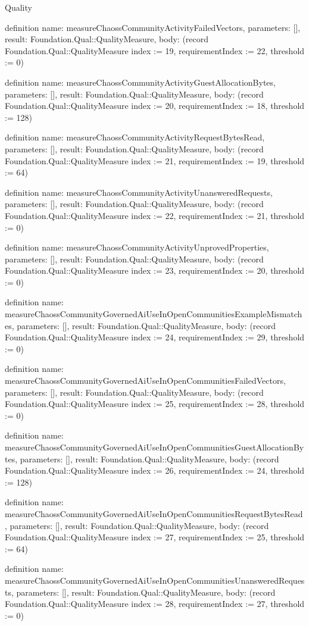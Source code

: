 \begin{lexlean}{Quality}
\begin{semanticmodule}
definition{
  name: measureChaossCommunityActivityFailedVectors,
  parameters: [],
  result: Foundation.Qual::QualityMeasure,
  body: (record Foundation.Qual::QualityMeasure {index := 19, requirementIndex := 22, threshold := 0})
}

definition{
  name: measureChaossCommunityActivityGuestAllocationBytes,
  parameters: [],
  result: Foundation.Qual::QualityMeasure,
  body: (record Foundation.Qual::QualityMeasure {index := 20, requirementIndex := 18, threshold := 128})
}

definition{
  name: measureChaossCommunityActivityRequestBytesRead,
  parameters: [],
  result: Foundation.Qual::QualityMeasure,
  body: (record Foundation.Qual::QualityMeasure {index := 21, requirementIndex := 19, threshold := 64})
}

definition{
  name: measureChaossCommunityActivityUnansweredRequests,
  parameters: [],
  result: Foundation.Qual::QualityMeasure,
  body: (record Foundation.Qual::QualityMeasure {index := 22, requirementIndex := 21, threshold := 0})
}

definition{
  name: measureChaossCommunityActivityUnprovedProperties,
  parameters: [],
  result: Foundation.Qual::QualityMeasure,
  body: (record Foundation.Qual::QualityMeasure {index := 23, requirementIndex := 20, threshold := 0})
}

definition{
  name: measureChaossCommunityGovernedAiUseInOpenCommunitiesExampleMismatches,
  parameters: [],
  result: Foundation.Qual::QualityMeasure,
  body: (record Foundation.Qual::QualityMeasure {index := 24, requirementIndex := 29, threshold := 0})
}

definition{
  name: measureChaossCommunityGovernedAiUseInOpenCommunitiesFailedVectors,
  parameters: [],
  result: Foundation.Qual::QualityMeasure,
  body: (record Foundation.Qual::QualityMeasure {index := 25, requirementIndex := 28, threshold := 0})
}

definition{
  name: measureChaossCommunityGovernedAiUseInOpenCommunitiesGuestAllocationBytes,
  parameters: [],
  result: Foundation.Qual::QualityMeasure,
  body: (record Foundation.Qual::QualityMeasure {index := 26, requirementIndex := 24, threshold := 128})
}

definition{
  name: measureChaossCommunityGovernedAiUseInOpenCommunitiesRequestBytesRead,
  parameters: [],
  result: Foundation.Qual::QualityMeasure,
  body: (record Foundation.Qual::QualityMeasure {index := 27, requirementIndex := 25, threshold := 64})
}

definition{
  name: measureChaossCommunityGovernedAiUseInOpenCommunitiesUnansweredRequests,
  parameters: [],
  result: Foundation.Qual::QualityMeasure,
  body: (record Foundation.Qual::QualityMeasure {index := 28, requirementIndex := 27, threshold := 0})
}


\end{semanticmodule}
\end{lexlean}
